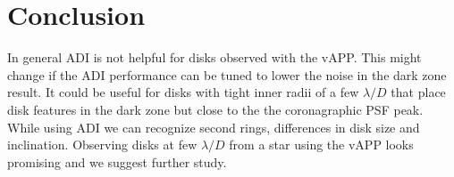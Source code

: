 \section{Conclusion}
In general \ac{ADI} is not helpful for disks observed with the \ac{vAPP}. This might change if the \ac{ADI} performance can be tuned to lower the noise in the dark zone result. It could be useful for disks with tight inner radii of a few $\lambda/D$ that place disk features in the dark zone but close to the the coronagraphic \ac{PSF} peak. While using \ac{ADI} we can recognize second rings, differences in disk size and inclination. Observing disks at few $\lambda/D$ from a star using the \ac{vAPP} looks promising and we suggest further study.

